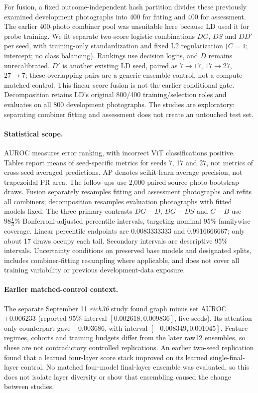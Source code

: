 For fusion, a fixed outcome-independent hash partition divides these
previously examined development photographs into 400 for fitting and 400
for assessment. The earlier 400-photo combiner pool was unsuitable here
because LD used it for probe training. We fit separate two-score logistic
combinations $DG$, $DS$ and $DD'$ per seed, with training-only
standardization and fixed L2 regularization ($C=1$; intercept; no class
balancing). Rankings use decision logits, and $D$ remains unrecalibrated.
$D'$ is another existing LD seed, paired as $7\!\to\!17$,
$17\!\to\!27$, $27\!\to\!7$; these overlapping pairs are a generic
ensemble control, not a compute-matched control. This linear score fusion
is not the earlier conditional gate. Decomposition retains LD's original
800/400 training/selection roles and evaluates on all 800 development
photographs. The studies are exploratory: separating combiner fitting
and assessment does not create an untouched test set.

\paragraph{Statistical scope.}
AUROC measures error ranking, with incorrect ViT classifications positive.
Tables report means of seed-specific metrics for seeds 7, 17 and 27, not
metrics of cross-seed averaged predictions. AP denotes scikit-learn
average precision, not trapezoidal PR area. The follow-ups use 2,000 paired
source-photo bootstrap draws. Fusion separately resamples fitting and
assessment photographs and refits all combiners; decomposition resamples
evaluation photographs with fitted models fixed. The three primary
contrasts $DG-D$, $DG-DS$ and $C-B$ use $98\frac{1}{3}\%$
Bonferroni-adjusted percentile intervals, targeting nominal 95\%
familywise coverage. Linear percentile endpoints are 0.0083333333 and
0.9916666667; only about 17 draws occupy each tail. Secondary intervals
are descriptive 95\% intervals. Uncertainty conditions on preserved base
models and designated splits, includes combiner-fitting resampling where
applicable, and does not cover all training variability or previous
development-data exposure.

\paragraph{Earlier matched-control context.}
The separate September 11 \emph{rich36} study found graph minus set AUROC
$+0.006233$ (reported 95\% interval $[0.002618,0.009836]$, five seeds).
Its attention-only counterpart gave $-0.003686$, with interval
$[-0.008349,0.001045]$. Feature regimes, cohorts and training budgets
differ from the later raw12 ensembles, so these are not contradictory
controlled replications. An earlier two-seed replication found that a learned
four-layer score stack improved on its learned single-final-layer control.
No matched four-model final-layer
ensemble was evaluated, so this does not isolate layer diversity or show
that ensembling caused the change between studies.

